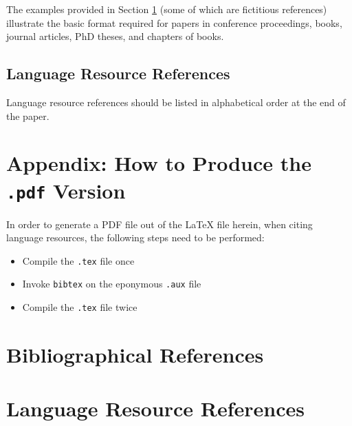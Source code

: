 \documentclass{article}
\begin{document}
The examples provided in Section \ref{reference} (some of which are fictitious
references) illustrate the basic format required for papers in conference
proceedings, books, journal articles, PhD theses, and chapters of books.

\subsection{Language Resource References}

Language resource references should be listed in alphabetical order at the end
of the paper.

\section*{Appendix: How to Produce the \texttt{.pdf} Version}

In order to generate a PDF file out of the LaTeX file herein, when citing
language resources, the following steps need to be performed:

\begin{itemize}
    \item{Compile the \texttt{.tex} file once}
    \item{Invoke \texttt{bibtex} on the eponymous \texttt{.aux} file}
    \item{Compile the \texttt{.tex} file twice}
\end{itemize}

\section{Bibliographical References}\label{reference}




\section{Language Resource References}
\label{lr:ref}
\end{document}
